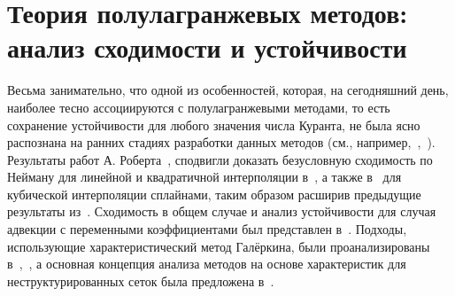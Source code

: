 \chapter{Теория полулагранжевых методов: анализ сходимости и устойчивости} \label{chapt_7}
Весьма занимательно, что одной из особенностей, которая, на сегодняшний день, наиболее тесно ассоциируются с полулагранжевыми методами, то есть сохранение устойчивости для любого значения числа Куранта, не была ясно распознана на ранних стадиях разработки данных методов (см., например,~\cite{A30},~\cite{A53}). Результаты работ А. Роберта~\cite{A59},\cite{A60} сподвигли доказать безусловную сходимость по Нейману для линейной и квадратичной интерполяции в~\cite{A3}, а также в~\cite{A52} для кубической интерполяции сплайнами, таким образом расширив предыдущие результаты из~\cite{A53}. Сходимость в общем случае и анализ устойчивости для случая адвекции с переменными коэффициентами был представлен в~\cite{A16}. Подходы, использующие характеристический метод Галёркина, были проанализированы в~\cite{A44},~\cite{A68}, а основная концепция анализа методов на основе характеристик для неструктурированных сеток была предложена в~\cite{A43}.

